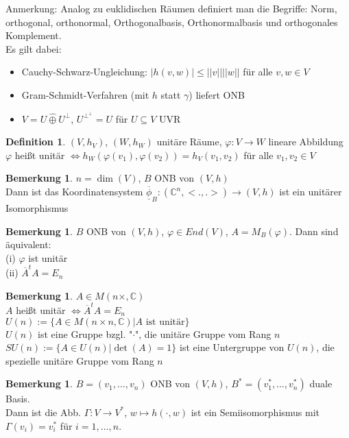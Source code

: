 \documentclass[10pt,a4paper,numbers=endperiod]{scrartcl}
\theoremstyle{definition}
\newtheorem{defi}[satz]{Definition}
\newtheorem{bem}[satz]{Bemerkung}
\def\CC{{\mathbb C}}
\begin{document}
Anmerkung: Analog zu euklidischen Räumen definiert man die Begriffe: Norm, orthogonal, orthonormal, Orthogonalbasis, Orthonormalbasis und orthogonales Komplement.\\
Es gilt dabei:
\begin{itemize}
	\item Cauchy-Schwarz-Ungleichung: $|h(v,w)| \leq ||v|| ||w||$ für alle $v,w \in V$
	\item Gram-Schmidt-Verfahren (mit $h$ statt $\gamma$) liefert ONB
	\item $V = U \hat{\oplus} U^{\perp}$, $U^{\perp^\perp} = U$ für $U \subseteq V$ UVR
\end{itemize}

\begin{defi}
	$(V, h_V)$, $(W, h_W)$ unitäre Räume, $\varphi: V \rightarrow W$ lineare Abbildung\\
	$\varphi$ heißt unitär $\Leftrightarrow h_W(\varphi(v_1), \varphi(v_2)) = h_V(v_1,v_2)$ für alle $v_1,v_2 \in V$
\end{defi}

\begin{bem}
	$n = \dim(V)$, $B$ ONB von $(V,h)$\\
	Dann ist das Koordinatensystem $\overline{\underline{\phi}}_B: (\CC^n, <.,.>) \rightarrow (V,h)$ ist ein unitärer Isomorphismus
\end{bem}

\begin{bem}
	$B$ ONB von $(V,h)$, $\varphi \in End(V)$, $A = M_B(\varphi)$. Dann sind äquivalent:\\
	(i) $\varphi$ ist unitär\\
	(ii) $\overline{A}^t A = E_n$
\end{bem}

\begin{bem}
	$A \in M(n \times, \CC)$\\
	$A$ heißt unitär $\Leftrightarrow \overline{A}^t A = E_n$\\
	$U(n) := \{A \in M(n \times n, \CC)| A \text{ ist unitär}\}$\\
	$U(n)$ ist eine Gruppe bzgl. "$\cdot$", die unitäre Gruppe vom Rang $n$\\
	$SU(n) := \{A \in U(n)| \det(A) = 1\}$ ist eine Untergruppe von $U(n)$, die spezielle unitäre Gruppe vom Rang $n$
\end{bem}

\begin{bem}
	$B = (v_1, \ldots, v_n)$ ONB von $(V, h)$, $B^* = (v_1^*, \ldots, v_n^*)$ duale Basis.\\
	Dann ist die Abb. $\Gamma: V \rightarrow V^*$, $w \mapsto h(\cdot, w)$ ist ein Semiisomorphismus mit $\Gamma(v_i) = v_i^*$ für $i = 1, \ldots, n$.
\end{bem}
\end{document}
